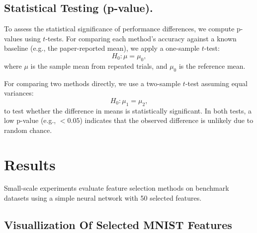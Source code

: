 \documentclass[a4paper,twocolumn]{article} %
\begin{document}
\subsection{Statistical Testing (p-value).}
To assess the statistical significance of performance differences, we compute p-values using $t$-tests. For comparing each method's accuracy against a known baseline (e.g., the paper-reported mean), we apply a one-sample $t$-test:
\begin{equation}
    H_0: \mu = \mu_0,
\end{equation}
where $\mu$ is the sample mean from repeated trials, and $\mu_0$ is the reference mean.

For comparing two methods directly, we use a two-sample $t$-test assuming equal variances:
\begin{equation}
    H_0: \mu_1 = \mu_2,
\end{equation}
to test whether the difference in means is statistically significant. In both tests, a low p-value (e.g., $< 0.05$) indicates that the observed difference is unlikely due to random chance.

\section{Results}
Small-scale experiments evaluate feature selection methods on benchmark datasets using a simple neural network with 50 selected features.
\subsection{Visuallization Of Selected MNIST Features}
\end{document}
